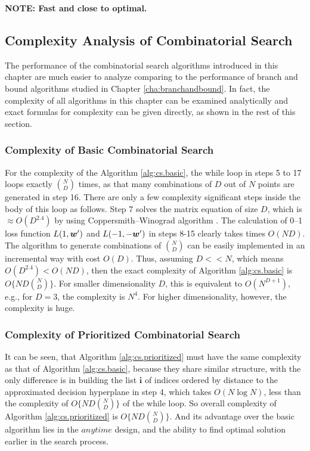 {\bf NOTE: Fast and close to optimal.}

\subsection{Complexity Analysis of Combinatorial Search}
\label{sec:cs.performance}

The performance of the combinatorial search algorithms introduced in
this chapter are much easier to analyze comparing to the performance
of branch and bound algorithms studied in Chapter
\ref{cha:branchandbound}. In fact, the complexity of all algorithms in
this chapter can be examined analytically and exact formulas for
complexity can be given directly, as shown in the rest of this
section.

\subsubsection{Complexity of Basic Combinatorial Search}

For the complexity of the Algorithm \ref{alg:cs.basic}, the while loop
in steps 5 to 17 loops exactly ${N \choose D}$ times, as that many
combinations of $D$ out of $N$ points are generated in step 16. There
are only a few complexity significant steps inside the body of this
loop as follows. Step 7 solves the matrix equation of size $D$, which
is $\approx O(D^{2.4})$ by using Coppersmith--Winograd algorithm
\cite{Coppersmith}. The calculation of 0--1 loss function $L(1,\boldsymbol{w}')$
and $L(-1,-\boldsymbol{w}')$ in steps 8-15 clearly takes times $O(ND)$. The
algorithm to generate combinations of ${N \choose D}$ can be easily
implemented in an incremental way with cost $O(D)$. Thus, assuming $D
<< N$, which means $O(D^{2.4}) < O(ND)$, then the exact complexity of
Algorithm \ref{alg:cs.basic} is $O\{ ND{N \choose D} \}$. For smaller
dimensionality $D$, this is equivalent to $O(N^{D+1})$, e.g., for
$D=3$, the complexity is $N^4$. For higher dimensionality, however,
the complexity is huge.

\subsubsection{Complexity of Prioritized Combinatorial Search}

It can be seen, that Algorithm \ref{alg:cs.prioritized} must have the
same complexity as that of Algorithm \ref{alg:cs.basic}, because they
share similar structure, with the only difference is in building the
list $\boldsymbol{i}$ of indices ordered by distance to the
approximated decision hyperplane in step 4, which takes $O(N \log N)$,
less than the complexity of $O\{ ND{N \choose D} \}$ of the while
loop. So overall complexity of Algorithm \ref{alg:cs.prioritized} is
$O\{ ND{N \choose D} \}$. And its advantage over the basic algorithm
lies in the $anytime$ design, and the ability to find optimal solution
earlier in the search process.

